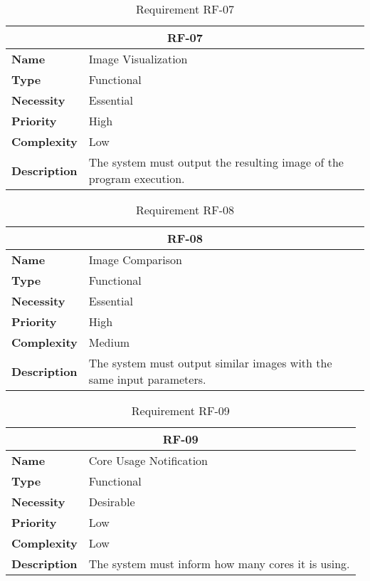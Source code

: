 \begin{table}[H]
    \centering
    \begin{tabular}{l p{10cm}}
        \toprule
        \multicolumn{2}{c}{\textbf{RF-07}} \\
        \toprule
        \textbf{Name}               & Image Visualization \\
        \textbf{Type}               & Functional \\
        \textbf{Necessity}          & Essential \\
        \textbf{Priority}           & High \\
        \textbf{Complexity}         & Low \\
        \textbf{Description}        & The system must output the resulting image of the program execution. \\
        \bottomrule
    \end{tabular}
\caption{Requirement RF-07}\label{tab:rf-07}
\end{table}

\begin{table}[H]
    \centering
    \begin{tabular}{l p{10cm}}
        \toprule
        \multicolumn{2}{c}{\textbf{RF-08}} \\
        \toprule
        \textbf{Name}               & Image Comparison \\
        \textbf{Type}               & Functional \\
        \textbf{Necessity}          & Essential \\
        \textbf{Priority}           & High \\
        \textbf{Complexity}         & Medium \\
        \textbf{Description}        & The system must output similar images with the same input parameters. \\
        \bottomrule
    \end{tabular}
\caption{Requirement RF-08}\label{tab:rf-08}
\end{table}

\begin{table}[H]
    \centering
    \begin{tabular}{l p{10cm}}
        \toprule
        \multicolumn{2}{c}{\textbf{RF-09}} \\
        \toprule
        \textbf{Name}               & Core Usage Notification \\
        \textbf{Type}               & Functional \\
        \textbf{Necessity}          & Desirable \\
        \textbf{Priority}           & Low \\
        \textbf{Complexity}         & Low \\
        \textbf{Description}        & The system must inform how many cores it is using. \\
        \bottomrule
    \end{tabular}
\caption{Requirement RF-09}\label{tab:rf-09}
\end{table}

